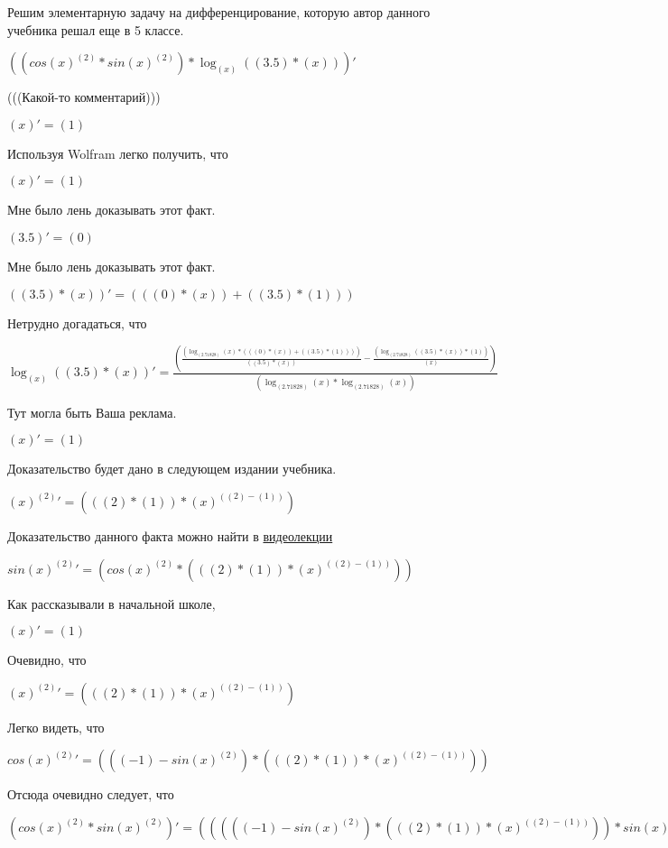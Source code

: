 \documentclass[12pt,a4paper,fleqn]{article}
\theoremstyle{definition}
\begin{document}
Решим элементарную задачу на дифференцирование, которую автор данного учебника решал еще в 5 классе.


$((cos{( x )}^{( 2 )} * sin{( x )}^{( 2 )}) * \log_{( x )}{(( 3.5 ) * ( x ))})'$

(((Какой-то комментарий)))

$( x )' = ( 1 )$

Используя Wolfram легко получить, что

$( x )' = ( 1 )$

Мне было лень доказывать этот факт.

$( 3.5 )' = ( 0 )$

Мне было лень доказывать этот факт.

$(( 3.5 ) * ( x ))' = ((( 0 ) * ( x )) + (( 3.5 ) * ( 1 )))$

Нетрудно догадаться, что

$\log_{( x )}{(( 3.5 ) * ( x ))}' = \frac{(\frac{(\log_{( 2.71828 )}{( x )} * ((( 0 ) * ( x )) + (( 3.5 ) * ( 1 ))))}{(( 3.5 ) * ( x ))}
 - \frac{(\log_{( 2.71828 )}{(( 3.5 ) * ( x ))} * ( 1 ))}{( x )}
)}{(\log_{( 2.71828 )}{( x )} * \log_{( 2.71828 )}{( x )})}
$

Тут могла быть Ваша реклама.

$( x )' = ( 1 )$

Доказательство будет дано в следующем издании учебника.

${( x )}^{( 2 )}' = ((( 2 ) * ( 1 )) * {( x )}^{(( 2 ) - ( 1 ))})$

Доказательство данного факта можно найти в \href{https://www.youtube.com/watch?v=dQw4w9WgXcQ}{видеолекции}

$sin{( x )}^{( 2 )}' = (cos{( x )}^{( 2 )} * ((( 2 ) * ( 1 )) * {( x )}^{(( 2 ) - ( 1 ))}))$

Как рассказывали в начальной школе,

$( x )' = ( 1 )$

Очевидно, что

${( x )}^{( 2 )}' = ((( 2 ) * ( 1 )) * {( x )}^{(( 2 ) - ( 1 ))})$

Легко видеть, что

$cos{( x )}^{( 2 )}' = ((( -1 ) - sin{( x )}^{( 2 )}) * ((( 2 ) * ( 1 )) * {( x )}^{(( 2 ) - ( 1 ))}))$

Отсюда очевидно следует, что

$(cos{( x )}^{( 2 )} * sin{( x )}^{( 2 )})' = ((((( -1 ) - sin{( x )}^{( 2 )}) * ((( 2 ) * ( 1 )) * {( x )}^{(( 2 ) - ( 1 ))})) * sin{( x )}^{( 2 )}) + (cos{( x )}^{( 2 )} * (cos{( x )}^{( 2 )} * ((( 2 ) * ( 1 )) * {( x )}^{(( 2 ) - ( 1 ))}))))$
\end{document}
